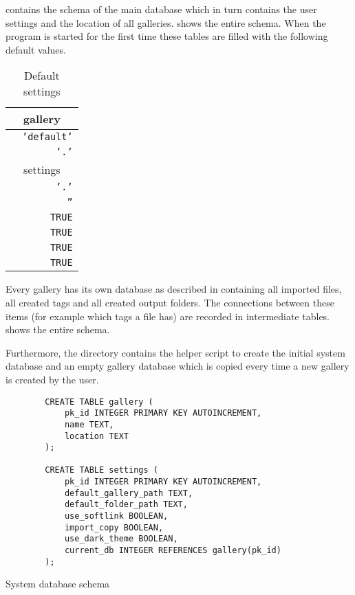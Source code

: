 
 contains the schema of the main database which in turn
contains the user settings and the location of all galleries.
 shows the entire schema. When the program is started for
the first time these tables are filled with the following default values.

\begin{table}[!h]
	\centering
	\begin{tabular}{lr}
		\toprule
		\multicolumn{2}{c}{gallery} \\
		\midrule
		\tfcode{name} & \texttt{'default'} \\
		\tfcode{location} & \texttt{'.'} \\
		\toprule
		\multicolumn{2}{c}{settings} \\
		\midrule
		\tfcode{default_gallery_path} & \texttt{'.'} \\
		\tfcode{default_folder_path} & \texttt{''} \\
		\tfcode{use_softlink} & \texttt{TRUE} \\
		\tfcode{import_copy} & \texttt{TRUE} \\
		\tfcode{use_dark_theme} & \texttt{TRUE} \\
		\tfcode{current_db} & \texttt{TRUE} \\
		\bottomrule
	\end{tabular}
	\caption{Default settings}
\end{table}

Every gallery has its own database as described in 
containing all imported files, all created tags and all created output folders.
The connections between these items (for example which tags a file has) are
recorded in intermediate tables.  shows the entire schema.

Furthermore, the directory contains the helper script  to
create the initial system database and an empty gallery database which is
copied every time a new gallery is created by the user.

\begin{listing}[!ht]
	\begin{verbatim}
		CREATE TABLE gallery (
			pk_id INTEGER PRIMARY KEY AUTOINCREMENT,
			name TEXT,
			location TEXT
		);

		CREATE TABLE settings (
			pk_id INTEGER PRIMARY KEY AUTOINCREMENT,
			default_gallery_path TEXT,
			default_folder_path TEXT,
			use_softlink BOOLEAN,
			import_copy BOOLEAN,
			use_dark_theme BOOLEAN,
			current_db INTEGER REFERENCES gallery(pk_id)
		);
	\end{verbatim}
	\caption{System database schema}
	\label{lst:db:system}
\end{listing}

